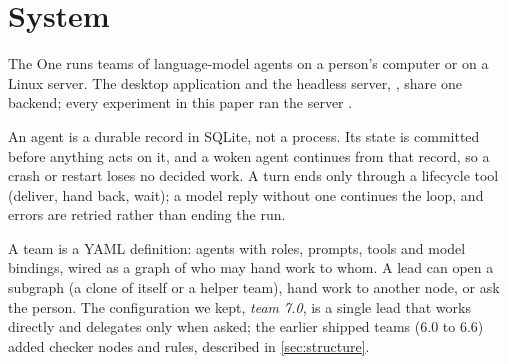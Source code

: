 \section{System}
\label{sec:system}

The One runs teams of language-model agents on a person's computer or on a Linux server. The
desktop application and the headless server, , share one backend; every
experiment in this paper ran the server \citep{zeroth2026server}.

 An agent is a durable record in SQLite, not a process. Its state is
committed before anything acts on it, and a woken agent continues from that record, so a crash or
restart loses no decided work. A turn ends only through a lifecycle tool (deliver, hand back,
wait); a model reply without one continues the loop, and errors are retried rather than ending the
run.

 A team is a YAML definition: agents with roles, prompts, tools and model
bindings, wired as a graph of who may hand work to whom. A lead can open a subgraph (a clone of
itself or a helper team), hand work to another node, or ask the person. The configuration we kept,
\emph{team 7.0}, is a single lead that works directly and delegates only when asked; the earlier
shipped teams (6.0 to 6.6) added checker nodes and rules, described in \cref{sec:structure}.

